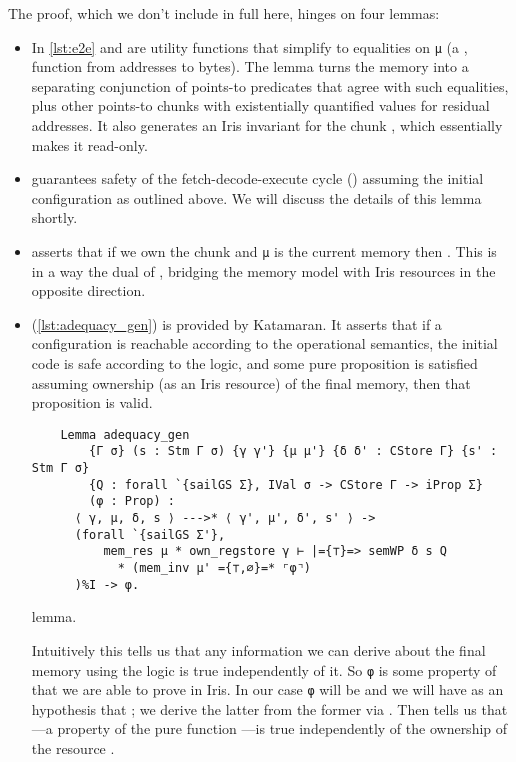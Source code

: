 The proof, which we don't include in full here, hinges on four lemmas:
\begin{itemize}
\item In \cref{lst:e2e}  and  are utility functions that simplify to equalities on \texttt{μ} (a , \ie function from addresses to bytes). The  lemma turns the memory into a separating conjunction of points-to predicates that agree with such equalities, plus other points-to chunks with existentially quantified values for residual addresses. It also generates an Iris invariant for the chunk , which essentially makes it read-only.
\item {} guarantees safety of the fetch-decode-execute cycle (\ie {}) assuming the initial configuration as outlined above. We will discuss the details of this lemma shortly.
\item {} asserts that if we own the chunk  and \texttt{μ} is the current memory then . This is in a way the dual of , bridging the memory model with Iris resources in the opposite direction.
\item {} (\cref{lst:adequacy_gen}) is provided by Katamaran. It  asserts that if a configuration is reachable according to the operational semantics, the initial code is safe according to the logic, and some pure proposition is satisfied assuming ownership (as an Iris resource) of the final memory, then that proposition is valid.

\begin{listing}[t]
  \begin{verbatim}
    Lemma adequacy_gen
        {Γ σ} (s : Stm Γ σ) {γ γ'} {μ μ'} {δ δ' : CStore Γ} {s' : Stm Γ σ}
        {Q : forall `{sailGS Σ}, IVal σ -> CStore Γ -> iProp Σ}
        (φ : Prop) :
      ⟨ γ, μ, δ, s ⟩ --->* ⟨ γ', μ', δ', s' ⟩ ->
      (forall `{sailGS Σ'},
          mem_res μ * own_regstore γ ⊢ |={⊤}=> semWP δ s Q
            * (mem_inv μ' ={⊤,∅}=* ⌜φ⌝)
      )%I -> φ.
  \end{verbatim}
  \vspace{0.5ex}
  \caption{ lemma.}
  \label{lst:adequacy_gen}
\end{listing}

  Intuitively this tells us that any information we can derive about the final memory using the logic is true independently of it. So \texttt{φ} is some property of  that we are able to prove in Iris. In our case \texttt{φ} will be  and we will have as an hypothesis that ; we derive the latter from the former via . Then  tells us that ---a property of the pure function ---is true independently of the ownership of the resource .
\end{itemize}


